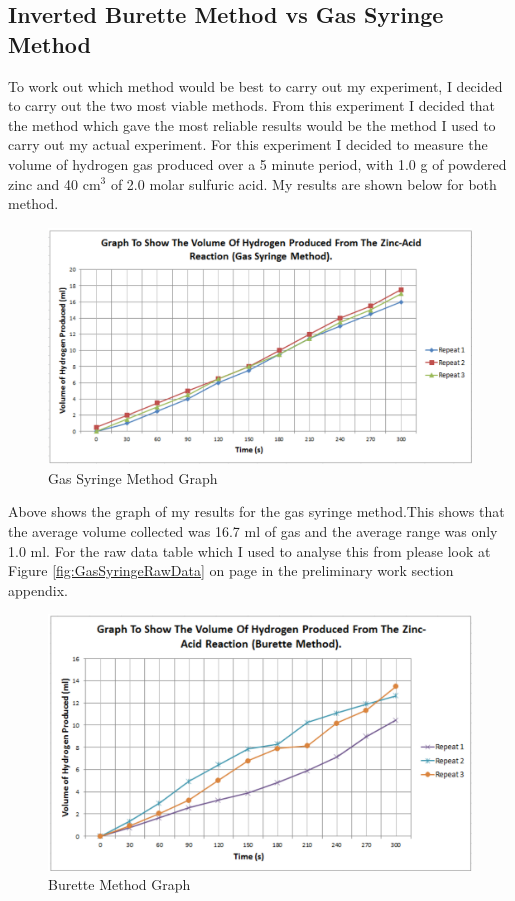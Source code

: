 	\subsection{Inverted Burette Method vs Gas Syringe Method} 

To work out which method would be best to carry out my experiment, I decided to carry out the two most viable methods. From this experiment I decided that the method which gave the most reliable results would be the method I used to carry out my actual experiment. For this experiment I decided to measure the volume of hydrogen gas produced over a 5 minute period, with 1.0 g of powdered zinc and 40 cm$^3$ of 2.0 molar sulfuric acid. My results are shown below for both method.

\begin{figure}[H]
    \includegraphics[width=\textwidth]{./preliminarywork/Graphs/Burette.pdf}
    \caption{Gas Syringe Method Graph} \label{fig:Gas Syringe Method Results}
\end{figure}

Above shows the graph of my results for the gas syringe method.This shows that the average volume collected was 16.7 ml of gas and the average range was only 1.0 ml. For the raw data table which I used to analyse this from please look at Figure \ref{fig:GasSyringeRawData} on page \pageref{fig:GasSyringeRawData} in the preliminary work section appendix.




\begin{figure}[H]
    \includegraphics[width=\textwidth]{./preliminarywork/Graphs/GasSyringe.pdf}
    \caption{Burette Method Graph} \label{fig:Burette Method Results}
\end{figure}

